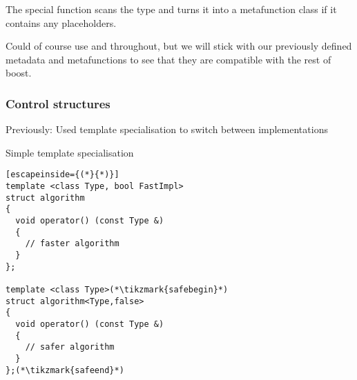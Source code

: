 \documentclass[11pt,a4paper,dvipsnames,usenames]{beamer}
\begin{document}
\begin{frame}[fragile]
{    \vspace{1em}

    The special  function scans the  type and turns it into a metafunction class
    if it contains any placeholders.
    
    \vspace{1em}

    Could of course use  and  throughout, but we will stick with
    our previously defined metadata and metafunctions to see that they are compatible with the rest of boost.
  }

  \vfill

\end{frame}

\begin{frame}[fragile]
  \frametitle{Control structures}

  Previously: Used template specialisation to switch between implementations

  \begin{exampleblock}{Simple template specialisation}
    \begin{lstlisting}[escapeinside={(*}{*)}]
template <class Type, bool FastImpl>
struct algorithm
{
  void operator() (const Type &)
  {
    // faster algorithm
  }
};

template <class Type>(*\tikzmark{safebegin}*)
struct algorithm<Type,false>
{
  void operator() (const Type &)
  {
    // safer algorithm
  }
};(*\tikzmark{safeend}*)
    \end{lstlisting}
  \end{exampleblock}


\end{frame}
\end{document}
